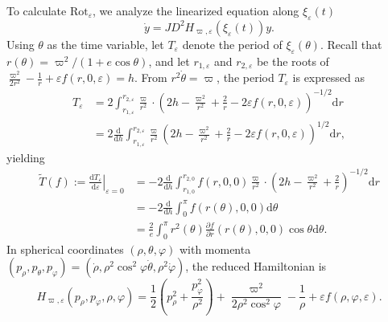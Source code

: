 \documentclass[11pt]{amsart}
\newcommand{\ep}{\varepsilon}
\newcommand{\tht}{\theta}
\newcommand{\om}{\varpi}
\begin{document}
To calculate $\text{Rot}_\ep$, we analyze the linearized equation along $\xi_{\ep}(t)$  
\begin{equation}\label{eq:linearized}
\dot{y} = J D^2 H_{\om,\ep}(\xi_{\ep}(t)) y. 
\end{equation} 
Using $\theta$ as the time variable, let $T_{\ep}$ denote the period of $\xi_{\ep}(\theta)$. Recall that $r(\theta)=\om^{2}\slash(1+e\cos\theta)$, and let $r_{1,\ep}$ and $r_{2,\ep}$ be the roots of  
$
\frac{\om^2}{2r^2} - \frac{1}{r} + \ep f(r, 0, \ep) = h.  
$  
From $r^2 \dot{\theta} = \om$, the period $T_{\ep}$ is expressed as
\begin{equation}
	\begin{aligned}
		T_{\ep}&=2\int_{r_{1,\ep}}^{r_{2,\ep}}\frac{\om}{r^{2}}\cdot\left(2h-\frac{\om^{2}}{r^{2}}+\frac{2}{r}-2\ep f(r,0,\ep)\right)^{-1/2}\mathrm{d}r\\
		&=2\frac{\mathrm{d}}{\mathrm{d}h}\int_{r_{1,\ep}}^{r_{2,\ep}}\frac{\om}{r^{2}}\left(2h-\frac{\om^{2}}{r^{2}}+\frac{2}{r}-2\ep f(r,0,\ep)\right)^{1/2}\mathrm{d}r,
	\end{aligned}
\end{equation}
yielding  
\begin{equation}\label{eq;tilde Tf}
	\begin{aligned}
		\tilde{T}(f):=\left.\frac{\mathrm{d}T_{\ep}}{\mathrm{d}\ep}\right|_{\ep=0}&=-2\frac{\mathrm{d}}{\mathrm{d}h}\int_{r_{1,0}}^{r_{2,0}}f(r,0,0)\frac{\om}{r^{2}}\cdot\left(2h-\frac{\om^{2}}{r^{2}}+\frac{2}{r}\right)^{-1/2}\mathrm{d}r\\
		&=-2\frac{\mathrm{d}}{\mathrm{d}h}\int_{0}^{\pi}f(r(\theta),0,0)\mathrm{d}\theta\\
		&=\frac{2}{e}\int_{0}^{\pi} r^{2}(\theta)\frac{\partial f}{\partial r}(r(\theta),0,0)\cos\theta\mathrm{d}\theta.
	\end{aligned}
\end{equation}
In spherical coordinates $(\rho, \tht, \varphi)$ with momenta $(p_{\rho},p_{\tht},p_{\varphi})=(\dot{\rho}, \rho^2\cos^2\varphi \dot{\tht},\rho^2\dot{\varphi})$, the reduced Hamiltonian is 
\begin{equation}
	H_{\om,\ep}(p_{\rho},p_{\varphi},\rho ,\varphi)=\frac{1}{2}(p_{\rho}^{2}+\frac{p_{\varphi}^{2}}{\rho^{2}})+\frac{\om^{2}}{2\rho^{2}\cos^{2}\varphi}-\frac{1}{\rho}+\ep f(\rho,\varphi,\ep).
\end{equation} 
\end{document}
